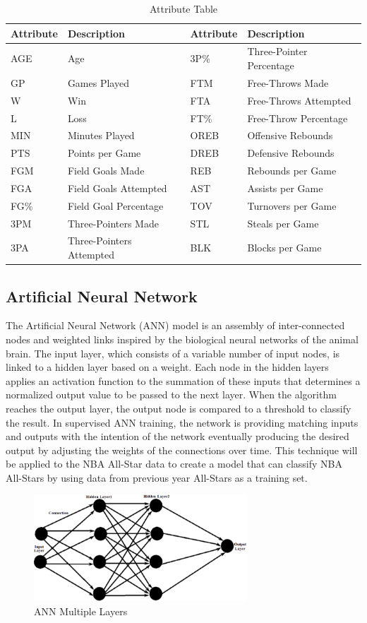 \documentclass{article}
\begin{document}
\begin{table}[htb!]
  \caption{Attribute Table}
  \label{attribute-table}
  \centering
  \begin{tabular}{llll}
    \toprule
    Attribute & Description & Attribute & Description \\
    \midrule
    AGE     & Age   & 3P\% &  Three-Pointer Percentage \\
    GP &  Games Played & FTM & Free-Throws Made\\
    W& Win &  FTA & Free-Throws Attempted\\
    L & Loss & FT\% & Free-Throw Percentage\\
    MIN & Minutes Played & OREB & Offensive Rebounds\\
    PTS & Points per Game & DREB & Defensive Rebounds\\
    FGM & Field Goals Made & REB & Rebounds per Game\\
    FGA & Field Goals Attempted & AST & Assists per Game\\
    FG\% & Field Goal Percentage & TOV & Turnovers per Game\\
    3PM & Three-Pointers Made & STL & Steals per Game\\
    3PA & Three-Pointers Attempted & BLK & Blocks per Game\\
    \bottomrule
  \end{tabular}
\end{table}

\subsection{Artificial Neural Network}
The Artificial Neural Network (ANN) model is an assembly of inter-connected nodes and weighted links inspired by the biological neural networks of the animal brain. The input layer, which consists of a variable number of input nodes, is linked to a hidden layer based on a weight. Each node in the hidden layers applies an activation function to the summation of these inputs that determines a normalized output value to be passed to the next layer. When the algorithm reaches the output layer, the output node is compared to a threshold to classify the result. In supervised ANN training, the network is providing matching inputs and outputs with the intention of the network eventually producing the desired output by adjusting the weights of the connections over time. This technique will be applied to the NBA All-Star data to create a model that can classify NBA All-Stars by using data from previous year All-Stars as a training set.
\begin{figure}[hbt!]
  \centering
  \includegraphics[width=8cm]{ann_layer.png}
  \caption{ANN Multiple Layers}
\end{figure}
\end{document}
